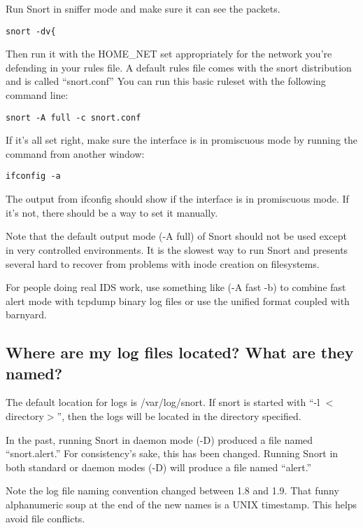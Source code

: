 \documentclass{article}
\begin{document}
Run Snort in sniffer mode and make sure it can see the packets.  

\begin{verbatim}snort -dv{\end{verbatim}

Then run it with the HOME\_NET set appropriately for the network
you're defending in your rules file.  A default rules file comes with the
snort distribution and is called ``snort.conf'' You can run this basic ruleset
with the following command line:

\begin{verbatim}snort -A full -c snort.conf\end{verbatim}

If it's all set right, make sure the interface is in promiscuous mode by running the 
command from another window:

\begin{verbatim}ifconfig -a\end{verbatim}

The output from ifconfig should show if the interface is in promiscuous mode.  
If it's not, there should be a way to set it manually.

Note that the default output mode (-A full) of Snort should not be
used except in very controlled environments.  It is the slowest way
to run Snort and presents several hard to recover from problems
with inode creation on filesystems.

For people doing real IDS work, use something like (-A fast -b) to
combine fast alert mode with tcpdump binary log files or use the
unified format coupled with barnyard.

\subsection{Where are my log files located?  What are they named?}

The default location for logs is /var/log/snort. If snort is started with ``-l
$<$directory$>$'', then the logs will be located in the directory specified.

In the past, running Snort in daemon mode (-D) produced a file named
``snort.alert.'' For consistency's sake, this has been changed. Running Snort in
both standard or daemon modes (-D) will produce a file named ``alert.''

Note the log file naming convention changed between 1.8 and 1.9. That funny
alphanumeric soup at the end of the new names is a UNIX timestamp. This helps
avoid file conflicts.
\end{document}
